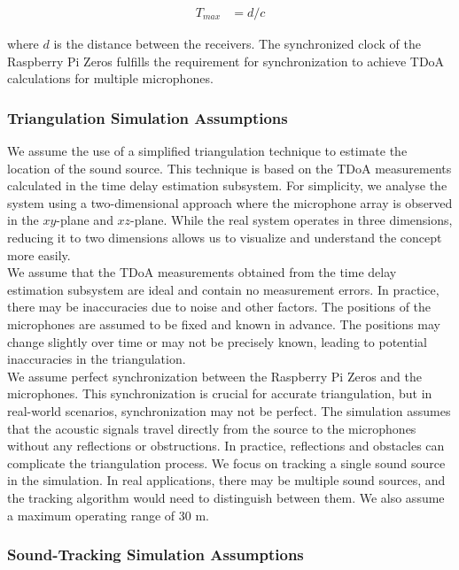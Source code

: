 \documentclass[a4paper,11pt]{article}
\begin{document}
\begin{align} 
	T_{max}	& = d/c 	
\end{align} 

where $d$ is the distance between the receivers. The synchronized clock of the Raspberry Pi Zeros fulfills the requirement for synchronization to achieve TDoA calculations for multiple microphones.  

\subsubsection{Triangulation Simulation Assumptions}
We assume the use of a simplified triangulation technique to estimate the location of the sound source. This technique is based on the TDoA measurements calculated in the time delay estimation subsystem. For simplicity, we analyse the system using a two-dimensional approach where the microphone array is observed in the $xy$-plane and $xz$-plane. While the real system operates in three dimensions, reducing it to two dimensions allows us to visualize and understand the concept more easily. \\

\noindent
We assume that the TDoA measurements obtained from the time delay estimation subsystem are ideal and contain no measurement errors. In practice, there may be inaccuracies due to noise and other factors. The positions of the microphones are assumed to be fixed and known in advance. The positions may change slightly over time or may not be precisely known, leading to potential inaccuracies in the triangulation.\\

\noindent
We assume perfect synchronization between the Raspberry Pi Zeros and the microphones. This synchronization is crucial for accurate triangulation, but in real-world scenarios, synchronization may not be perfect. The simulation assumes that the acoustic signals travel directly from the source to the microphones without any reflections or obstructions. In practice, reflections and obstacles can complicate the triangulation process. We focus on tracking a single sound source in the simulation. In real applications, there may be multiple sound sources, and the tracking algorithm would need to distinguish between them. We also assume a maximum operating range of 30 m. 

\subsubsection{Sound-Tracking Simulation Assumptions}
\end{document}
